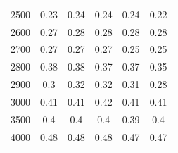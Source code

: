 \begin{table}[htbp]
\begin{center}
\begin{tabular}{lccccc}
            2500 & 0.23 & 0.24 & 0.24 & 0.24 & 0.22 \\
            2600 & 0.27 & 0.28 & 0.28 & 0.28 & 0.28 \\
            2700 & 0.27 & 0.27 & 0.27 & 0.25 & 0.25 \\
            2800 & 0.38 & 0.38 & 0.37 & 0.37 & 0.35 \\
            2900 & 0.3 & 0.32 & 0.32 & 0.31 & 0.28 \\
            3000 & 0.41 & 0.41 & 0.42 & 0.41 & 0.41 \\
            3500 & 0.4 & 0.4 & 0.4 & 0.39 & 0.4 \\
            4000 & 0.48 & 0.48 & 0.48 & 0.47 & 0.47 \\ \hline\hline
        \end{tabular}
        \label{tab:gesystsig}
    \end{center}
\end{table}